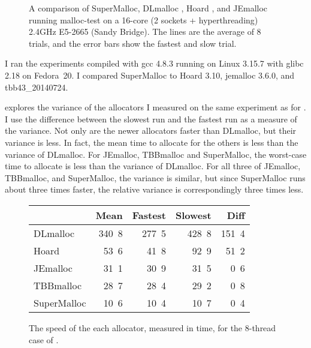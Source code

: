 \documentclass[natbib,sort&compress]{sigplanconf}
\newcommand{\ns}[1]{\unit{#1}\nano\second{}}
\begin{document}
\begin{figure}

\caption{A comparison of SuperMalloc, DLmalloc \cite{Lea96}, Hoard
  \cite{BergerMcBl00}, and JEmalloc~\cite{Evans06} running malloc-test
  on a 16-core (2 sockets + hyperthreading) 2.4GHz E5-2665 (Sandy
  Bridge).  The lines are the average of 8 trials, and the error bars
  show the fastest and slow trial.}
\label{fig:datalock}
\vspace*{-3ex}
\end{figure}

I ran the experiments compiled with gcc 4.8.3 running on Linux 3.15.7
with glibc 2.18 on Fedora~20.  I compared SuperMalloc to Hoard 3.10,
jemalloc 3.6.0, and tbb43\_20140724.

 explores the variance of the allocators I measured
on the same experiment as for .  I use the difference
between the slowest run and the fastest run as a measure of the
variance.  Not only are the newer allocators faster than DLmalloc, but
their variance is less.  In fact, the mean time to allocate for the
others is less than the variance of DLmalloc. For JEmalloc, TBBmalloc
and SuperMalloc, the worst-case time to allocate is less than the
variance of DLmalloc.  For all three of JEmalloc, TBBmalloc, and
SuperMalloc, the variance is similar, but since SuperMalloc runs about
three times faster, the relative variance is correspondingly three
times less.

\begin{figure}
\begin{center}
\begin{tabular}{l@{}rrrr}
            & Mean       & Fastest    & Slowest     & Diff       \\ \hline
DLmalloc    & \ns{340.8} & \ns{277.5} & \ns{428.8}  & \ns{151.4} \\
Hoard       & \ns{ 53.6} & \ns{ 41.8} & \ns{ 92.9}  & \ns{ 51.2} \\
JEmalloc    & \ns{ 31.1} & \ns{ 30.9} & \ns{ 31.5}  & \ns{  0.6} \\
TBBmalloc   & \ns{ 28.7} & \ns{ 28.4} & \ns{ 29.2}  & \ns{  0.8} \\
SuperMalloc & \ns{ 10.6} & \ns{ 10.4} & \ns{ 10.7}  & \ns{  0.4} \\
\end{tabular}
\end{center}
\caption{The speed of the each allocator, measured in time, for the
  8-thread case of .  }
\label{fig:variance}
\end{figure}
\end{document}
